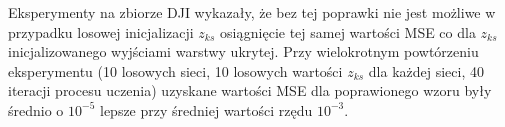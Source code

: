 \documentclass[11pt,a4paper]{article}
\begin{document}
\begin{figure}[h!]
\begin{floatrow}
\end{floatrow}
\end{figure}


Eksperymenty na zbiorze DJI wykazały, że bez tej poprawki nie jest możliwe w przypadku losowej inicjalizacji $z_{ks}$ osiągnięcie tej samej wartości MSE co dla $z_{ks}$ inicjalizowanego wyjściami warstwy ukrytej. Przy wielokrotnym powtórzeniu eksperymentu (10 losowych sieci, 10 losowych wartości $z_{ks}$ dla każdej sieci, 40 iteracji procesu uczenia) uzyskane wartości MSE dla poprawionego wzoru były średnio o $10^{-5}$ lepsze przy średniej wartości rzędu $10^{-3}$.
\end{document}
